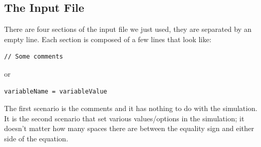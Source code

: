 \documentclass{amsproc}
\theoremstyle{definition}
\theoremstyle{remark}
\numberwithin{equation}{section}
\numberwithin{figure}{section}
\begin{document}
\subsection{The Input File}
There are four sections of the input file we just used, they are separated by an empty line.
Each section is composed of a few lines that look like:
\begin{lstlisting}[backgroundcolor = \color{lightgray}, language = bash, xleftmargin = 0.1cm, framexleftmargin = 0.1cm]
// Some comments
\end{lstlisting}
or
\begin{lstlisting}[backgroundcolor = \color{lightgray}, language = bash, xleftmargin = 0.1cm, framexleftmargin = 0.1cm]
variableName = variableValue
\end{lstlisting}
The first scenario is the comments and it has nothing to do with the simulation. 
It is the second scenario that set various values/options in the simulation; it doesn't matter how many spaces there are between the equality sign and either side of the equation.
\end{document}
